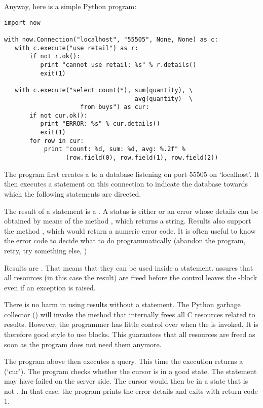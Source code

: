 Anyway, here is a simple Python program:

\begin{python}
\begin{lstlisting}
import now

with now.Connection("localhost", "55505", None, None) as c:
   with c.execute("use retail") as r:
       if not r.ok():
          print "cannot use retail: %s" % r.details()
          exit(1)

   with c.execute("select count(*), sum(quantity), \
                                    avg(quantity)  \
                     from buys") as cur:
       if not cur.ok():
          print "ERROR: %s" % cur.details()
          exit(1)
       for row in cur:
           print "count: %d, sum: %d, avg: %.2f" %
                 (row.field(0), row.field(1), row.field(2))
\end{lstlisting}
\end{python}

The program first creates a 
to a database listening on port 55505 on `localhost'.
It then executes a \term{use} statement on this connection
to indicate the database towards which
the following statements are directed.

The result of a  statement is a .
A status is either  or an error
whose details can be obtained by means of the method
\term{details()}, which returns a string.
Results also support the method \term{code()},
which would return a numeric error code.
It is often useful to know the error code to decide
what to do programmatically (abandon the program,
retry, try something else, \etc)

Results are . That means
that they can be used inside a  statement.
 assures that all resources (in this case
the result) are freed before the control leaves
the -block even if an exception is raised.

There is no harm in using results without a \term{with} statement.
The Python garbage collector () will invoke the method
that internally frees all C resources related to results.
However, the programmer has little control over when
the \acronym{gc} is invoked. It is therefore good style
to use \term{with} blocks. This guarantees that all resources
are freed as soon as the program does not need them anymore.

The program above then executes a query.
This time the execution returns a  (`cur').
The program checks whether the cursor is
in a good state. The statement may have
failed on the server side. The cursor would
then be in a state that is not .
In that case, the program prints the error details
and exits with return code 1.

